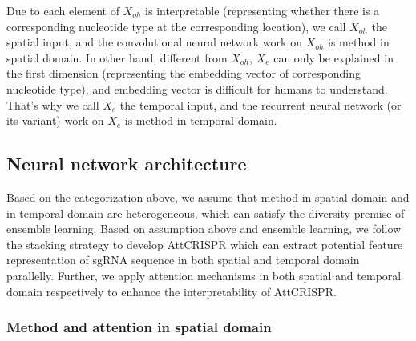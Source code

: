 \documentclass{bioinfo}
\begin{document}
Due to each element of $X_{oh}$ is interpretable (representing whether there is a corresponding nucleotide type at the corresponding location), 
we call $X_{oh}$ the spatial input, and the convolutional neural network work on $X_{oh}$ is method in spatial domain. 
In other hand, different from $X_{oh}$, $X_e$ can only be explained in the first dimension (representing the embedding vector of corresponding nucleotide type), 
and embedding vector is difficult for humans to understand. 
That's why we call $X_e$ the temporal input, and the recurrent neural network (or its variant) work on $X_e$ is method in temporal domain. 

\subsection{Neural network architecture}

Based on the categorization above, we assume that method in spatial domain and in temporal domain are heterogeneous, 
which can satisfy the diversity premise of ensemble learning. 
Based on assumption above and ensemble learning, we follow the stacking strategy to develop AttCRISPR 
which can extract potential feature representation of sgRNA sequence in both spatial and temporal domain parallelly. 
Further, we apply attention mechanisms in both spatial and temporal domain respectively to enhance the interpretability of AttCRISPR.

\subsubsection{Method and attention in spatial domain}
\end{document}
